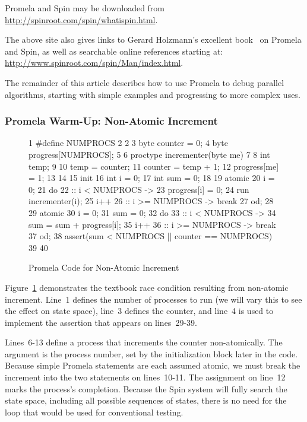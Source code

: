 Promela and Spin may be downloaded from
\url{http://spinroot.com/spin/whatispin.html}.

The above site also gives links to Gerard Holzmann's excellent
book~\cite{Holzmann03a} on Promela and Spin,
as well as searchable online references starting at:
\url{http://www.spinroot.com/spin/Man/index.html}.

The remainder of this article describes how to use Promela to debug
parallel algorithms, starting with simple examples and progressing to
more complex uses.

\subsubsection{Promela Warm-Up: Non-Atomic Increment}
\label{sec:formal:Promela Warm-Up: Non-Atomic Increment}

\begin{figure}[tbp]
{ \scriptsize
\begin{verbbox}
  1 #define NUMPROCS 2
  2
  3 byte counter = 0;
  4 byte progress[NUMPROCS];
  5
  6 proctype incrementer(byte me)
  7 {
  8   int temp;
  9
 10   temp = counter;
 11   counter = temp + 1;
 12   progress[me] = 1;
 13 }
 14
 15 init {
 16   int i = 0;
 17   int sum = 0;
 18
 19   atomic {
 20     i = 0;
 21     do
 22     :: i < NUMPROCS ->
 23       progress[i] = 0;
 24       run incrementer(i);
 25       i++
 26     :: i >= NUMPROCS -> break
 27     od;
 28   }
 29   atomic {
 30     i = 0;
 31     sum = 0;
 32     do
 33     :: i < NUMPROCS ->
 34       sum = sum + progress[i];
 35       i++
 36     :: i >= NUMPROCS -> break
 37     od;
 38     assert(sum < NUMPROCS || counter == NUMPROCS)
 39   }
 40 }
\end{verbbox}
}
\centering
\theverbbox
\caption{Promela Code for Non-Atomic Increment}
\label{fig:analysis:Promela Code for Non-Atomic Increment}
\end{figure}

Figure~\ref{fig:analysis:Promela Code for Non-Atomic Increment}
demonstrates the textbook race condition
resulting from non-atomic increment.
Line~1 defines the number of processes to run (we will vary this
to see the effect on state space), line~3 defines the counter,
and line~4 is used to implement the assertion that appears on
lines~29-39.

Lines~6-13 define a process that increments the counter non-atomically.
The argument  is the process number, set by the initialization
block later in the code.
Because simple Promela statements are each assumed atomic, we must
break the increment into the two statements on lines~10-11.
The assignment on line~12 marks the process's completion.
Because the Spin system will fully search the state space, including
all possible sequences of states, there is no need for the loop
that would be used for conventional testing.


